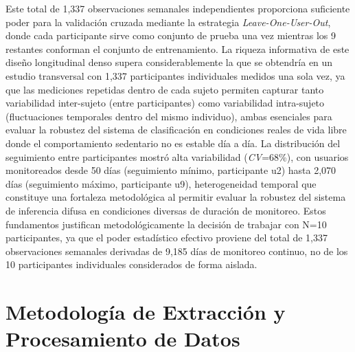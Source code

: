 Este total de 1,337 observaciones semanales independientes proporciona suficiente poder para la validación cruzada mediante la estrategia \textit{Leave-One-User-Out}, donde cada participante sirve como conjunto de prueba una vez mientras los 9 restantes conforman el conjunto de entrenamiento. La riqueza informativa de este diseño longitudinal denso supera considerablemente la que se obtendría en un estudio transversal con 1,337 participantes individuales medidos una sola vez, ya que las mediciones repetidas dentro de cada sujeto permiten capturar tanto variabilidad inter-sujeto (entre participantes) como variabilidad intra-sujeto (fluctuaciones temporales dentro del mismo individuo), ambas esenciales para evaluar la robustez del sistema de clasificación en condiciones reales de vida libre donde el comportamiento sedentario no es estable día a día. La distribución del seguimiento entre participantes mostró alta variabilidad (\textit{CV}=68\%), con usuarios monitoreados desde 50 días (seguimiento mínimo, participante u2) hasta 2,070 días (seguimiento máximo, participante u9), heterogeneidad temporal que constituye una fortaleza metodológica al permitir evaluar la robustez del sistema de inferencia difusa en condiciones diversas de duración de monitoreo. Estos fundamentos justifican metodológicamente la decisión de trabajar con N=10 participantes, ya que el poder estadístico efectivo proviene del total de 1,337 observaciones semanales derivadas de 9,185 días de monitoreo continuo, no de los 10 participantes individuales considerados de forma aislada.


\section{Metodología de Extracción y Procesamiento de Datos}
\label{sec:metodologia_extraccion}

